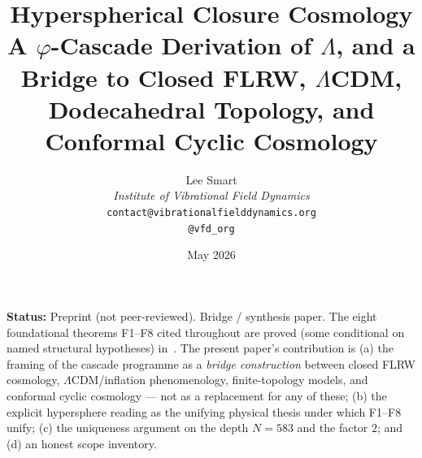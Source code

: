 \documentclass[11pt]{article}
\title{Hyperspherical Closure Cosmology\\[6pt]
\large A $\varphi$-Cascade Derivation of $\Lambda$, and a Bridge to Closed FLRW, $\Lambda$CDM, Dodecahedral Topology, and Conformal Cyclic Cosmology}
\author{%
  Lee Smart\\[4pt]
  \textit{Institute of Vibrational Field Dynamics}\\[2pt]
  \texttt{contact@vibrationalfielddynamics.org}\\[2pt]
  \texttt{@vfd\_org}%
}
\date{May 2026}
\theoremstyle{plain}
\theoremstyle{definition}
\theoremstyle{remark}
\begin{document}
\maketitle

\noindent\textbf{Status:} Preprint (not peer-reviewed). Bridge / synthesis paper. The eight foundational theorems F1--F8 cited throughout are proved (some conditional on named structural hypotheses) in~\citet{SmartXXXVI}. The present paper's contribution is (a) the framing of the cascade programme as a \emph{bridge construction} between closed FLRW cosmology, $\Lambda$CDM/inflation phenomenology, finite-topology models, and conformal cyclic cosmology --- not as a replacement for any of these; (b) the explicit hypersphere reading as the unifying physical thesis under which F1--F8 unify; (c) the uniqueness argument on the depth $N = 583$ and the factor $2$; and (d) an honest scope inventory.
\end{document}
